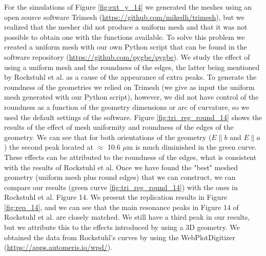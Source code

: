 For the simulations of Figure \ref{fig:ext_y_14} we generated the meshes using an open source software Trimesh (\url{https://github.com/mikedh/trimesh}), 
but we realized that the mesher did not produce a uniform mesh and that it was not possible to obtain one with the functions available. To solve this problem 
we created a uniform mesh with our own Python script that can be found in the software repository (\url{https://github.com/pygbe/pygbe}). We study the 
effect of using a uniform mesh and the roundness of the edges, the latter being mentioned by Rockstuhl et al. as a cause of the appearance of extra peaks. To 
generate the roundness of the geometries we relied on Trimesh (we give as input the uniform mesh generated with our Python script), however, we did not have 
control of the roundness as a function of the geometry dimensions or arc of curvature, so we used the default settings of
the software. Figure \ref{fig:tri_reg_round_14} shows the results of the effect of mesh uniformity and roundness of the edges of the geometry. We can see 
that for both orientations of the geometry ($E\parallel b$ and $E\parallel a$) the second peak located at $\approx$ 10.6 $\mu$m is much diminished in the
green curve. These effects can be attributed to the roundness of the edges, what is consistent with the results of Rockstuhl et al. Once we have found the
"best" meshed geometry (uniform mesh plus round edges) that we can construct, we can compare our results (green curve \ref{fig:tri_reg_round_14}) with the ones
in Rockstuhl et al. Figure 14. We present the replication results in Figure \ref{fig:rep_14}, and we can see that the main resonance peaks in Figure 14 of 
Rockstuhl et al. are closely matched. We still have a third peak in our results, but we attribute this to the effects introduced by using a 3D geometry. We 
obtained the data from Rockstuhl's curves by using the WebPlotDigitizer (\url{https://apps.automeris.io/wpd/}).
 

